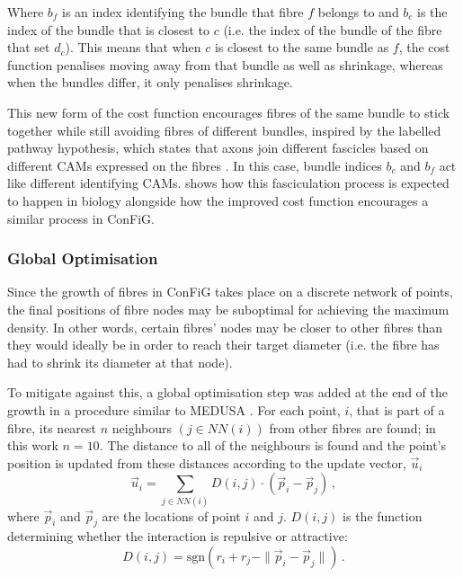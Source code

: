 Where $b_f$ is an index identifying the bundle that fibre $f$ belongs to and $b_c$ is the index of the bundle that is closest to $c$ (i.e. the index of the bundle of the fibre that set $d_c$). This means that when $c$ is closest to the same bundle as $f$, the cost function penalises moving away from that bundle as well as shrinkage, whereas when the bundles differ, it only penalises shrinkage.

This new form of the cost function encourages fibres of the same bundle to stick together while still avoiding fibres of different bundles, inspired by the labelled pathway hypothesis, which states that axons join different fascicles based on different CAMs expressed on the fibres \cite{Price2017}. In this case, bundle indices $b_c$ and $b_f$ act like different identifying CAMs.  shows how this fasciculation process is expected to happen in biology alongside how the improved cost function encourages a similar process in ConFiG.

\subsubsection{Global Optimisation}
\label{sec:config_global_optimisation}
Since the growth of fibres in ConFiG takes place on a discrete network of points, the final positions of fibre nodes may be suboptimal for achieving the maximum density. In other words, certain fibres’ nodes may be closer to other fibres than they would ideally be in order to reach their target diameter (i.e. the fibre has had to shrink its diameter at that node).

To mitigate against this, a global optimisation step was added at the end of the growth in a procedure similar to MEDUSA \cite{Ginsburger2019}. For each point, $i$, that is part of a fibre, its nearest $n$ neighbours $(j \in NN(i))$ from other fibres are found; in this work $n=10$. The distance to all of the neighbours is found and the point’s position is updated from these distances according to the update vector, $\vec{u}_i$
\begin{equation}
  \label{eq:global_opt_update_vec}
\vec{u}_i= \sum_{j \in NN(i)} D(i,j) \cdot \left(\vec{p}_i - \vec{p}_j\right) \,,
\end{equation}
where $\vec{p}_i$ and $\vec{p}_j$ are the locations of point $i$ and $j$. $D(i,j)$ is the function determining whether the interaction is repulsive or attractive:
\begin{equation}
  \label{eq:global_opt_Dij}
  D(i, j) = \mathrm{sgn}\left(r_i + r_j - \|\vec{p}_i - \vec{p}_j\|\right) \,.
\end{equation}

